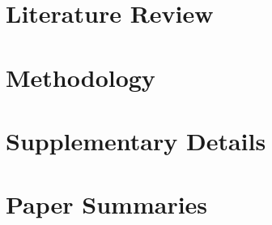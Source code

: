 \documentclass[]{article}
\begin{document}
\section{Literature Review}

\section{Methodology}




\newpage

\appendix

\section{Supplementary Details}
\newpage


\section{Paper Summaries}

\newpage

\newpage

\newpage

\newpage

\newpage



\newpage
\thispagestyle{empty}
\listoffigures
\newpage
\listoftables


\newpage


\end{document}
